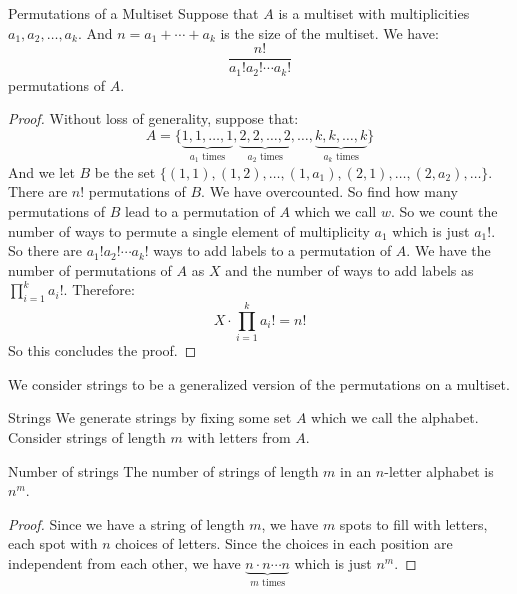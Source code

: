\documentclass{report}
\begin{document}
\begin{theorem}{Permutations of a Multiset}
    Suppose that $A$ is a multiset with multiplicities $a_{1}, a_{2}, \ldots, a_{k}$. And $n = a_{1} + \cdots + a_{k}$ is the size of the multiset. We have:
        \begin{equation*}
            \dfrac{n!}{a_{1}!a_{2}!\cdots a_{k}!}
        \end{equation*}
    permutations of $A$.
\end{theorem}
    \begin{proof}
        Without loss of generality, suppose that:
            \begin{equation*}
                A = \{\underbrace{1, 1, \ldots, 1}_{a_{1} \text{ times}}, \underbrace{2, 2, \ldots, 2}_{a_{2} \text{ times}}, \ldots, \underbrace{k, k, \ldots, k}_{a_{k} \text{ times}}\}
            \end{equation*}
        And we let $B$ be the set $\{(1, 1), (1, 2), \ldots, (1, a_{1}), (2, 1), \ldots, (2, a_{2}), \ldots\}$. There are $n!$ permutations of $B$. We have overcounted. So find how many permutations of $B$ lead to a permutation of $A$ which we call $w$. So we count the number of ways to permute a single element of multiplicity $a_{1}$ which is just $a_{1}!$. So there are $a_{1}!a_{2}! \cdots a_{k}!$ ways to add labels to a permutation of $A$. We have the number of permutations of $A$ as $X$ and the number of ways to add labels as $\prod_{i = 1}^{k} a_{i}!$. Therefore:
            \begin{equation*}
                X \cdot \prod_{i = 1}^{k} a_{i}! = n!
            \end{equation*}
        So this concludes the proof.
    \end{proof}

We consider strings to be a generalized version of the permutations on a multiset.
\begin{definition}{Strings}
    We generate strings by fixing some set $A$ which we call the alphabet. Consider strings of length $m$ with letters from $A$.
\end{definition}

\begin{theorem}{Number of strings}
    The number of strings of length $m$ in an $n$-letter alphabet is $n^{m}$.
\end{theorem}
    \begin{proof}
        Since we have a string of length $m$, we have $m$ spots to fill with letters, each spot with $n$ choices of letters. Since the choices in each position are independent from each other, we have $\underbrace{n \cdot n \cdots n}_{m \text{ times}}$ which is just $n^{m}$.
    \end{proof}
\end{document}
